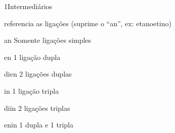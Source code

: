 \documentclass[\mainfilename]{subfiles}
\begin{document}
\begin{sectionBox}1{Intermediários} %
    
    referencia as ligações
    (suprime o ``an'', ex: etano\to etino)

    \begin{description}
        \begin{multicols}{2}
            \item[an] Somente ligações simples
            \item[en] 1 ligação dupla
            \item[dien] 2 ligações duplas
            \item[in] 1 ligação tripla
            \item[diin] 2 ligações triplas
            \item[enin] 1 dupla e 1 tripla
        \end{multicols}
    \end{description}

\end{sectionBox}
\end{document}

